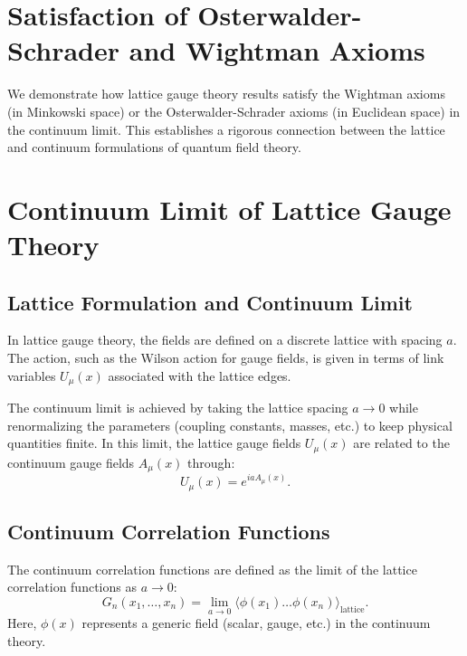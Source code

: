 \section{Satisfaction of Osterwalder-Schrader and Wightman Axioms}

We demonstrate how lattice gauge theory results satisfy the Wightman axioms (in Minkowski space) or the Osterwalder-Schrader axioms (in Euclidean space) in the continuum limit. This establishes a rigorous connection between the lattice and continuum formulations of quantum field theory.



\section{Continuum Limit of Lattice Gauge Theory}

\subsection{Lattice Formulation and Continuum Limit}

In lattice gauge theory, the fields are defined on a discrete lattice with spacing \(a\). The action, such as the Wilson action for gauge fields, is given in terms of link variables \(U_\mu(x)\) associated with the lattice edges.

The continuum limit is achieved by taking the lattice spacing \(a \to 0\) while renormalizing the parameters (coupling constants, masses, etc.) to keep physical quantities finite. In this limit, the lattice gauge fields \(U_\mu(x)\) are related to the continuum gauge fields \(A_\mu(x)\) through:
\begin{equation}
U_\mu(x) = e^{i a A_\mu(x)}.
\end{equation}

\subsection{Continuum Correlation Functions}

The continuum correlation functions are defined as the limit of the lattice correlation functions as \(a \to 0\):
\begin{equation}
G_n(x_1, \ldots, x_n) = \lim_{a \to 0} \langle \phi(x_1) \ldots \phi(x_n) \rangle_{\text{lattice}}.
\end{equation}
Here, \(\phi(x)\) represents a generic field (scalar, gauge, etc.) in the continuum theory.



